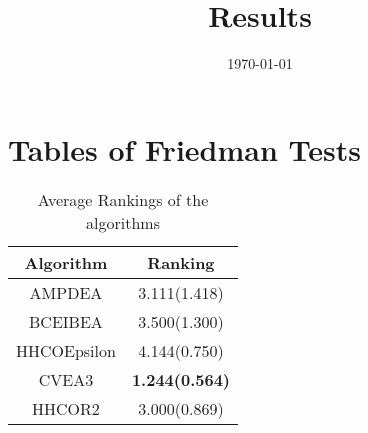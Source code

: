 \documentclass{article}
\title{Results}
\author{}
\date{\today}
\begin{document}
\oddsidemargin 0in \topmargin 0in\maketitle
\section{Tables of Friedman Tests}
\begin{table}[!htp]
\centering
\caption{Average Rankings of the algorithms
}\begin{tabular}{|c|c|}
\hline
Algorithm&Ranking\\
\hline
AMPDEA&3.111(1.418)\\\hline
BCEIBEA&3.500(1.300)\\\hline
HHCOEpsilon&4.144(0.750)\\\hline
CVEA3& {\bf 1.244(0.564)}\\\hline
HHCOR2&3.000(0.869)\\\hline
\end{tabular}
\end{table}
\end{document}
